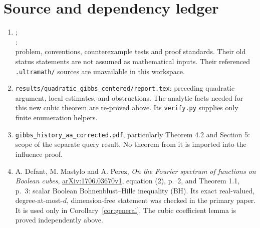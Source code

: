 \documentclass[11pt]{article}
\begin{document}
\appendix
\section{Source and dependency ledger}
\begin{enumerate}
\item {};\\
:\\
problem, conventions,
counterexample tests and proof standards. Their old status statements
are not assumed as mathematical inputs. Their referenced
\texttt{.ultramath/} sources are unavailable in this workspace.
\item \texttt{results/quadratic\_gibbs\_centered/report.tex}:
preceding quadratic argument, local estimates, and obstructions.
The analytic facts needed for this new cubic theorem are re-proved
above. Its \texttt{verify.py} supplies only finite enumeration helpers.
\item \texttt{gibbs\_history\_aa\_corrected.pdf}, particularly
Theorem 4.2 and Section 5: scope of the separate query result.
No theorem from it is imported into the influence proof.
\item A. Defant, M. Mastylo and A. Perez,
\emph{On the Fourier spectrum of functions on Boolean cubes},
\href{https://arxiv.org/pdf/1706.03670}{arXiv:1706.03670v1},
equation (2), p.~2, and Theorem 1.1, p.~3: scalar Boolean
Bohnenblust--Hille inequality (BH). Its exact real-valued,
degree-at-most-$d$, dimension-free statement was checked in the
primary paper. It is used only in Corollary~\ref{cor:general}.
The cubic coefficient lemma is proved independently above.
\end{enumerate}
\end{document}
